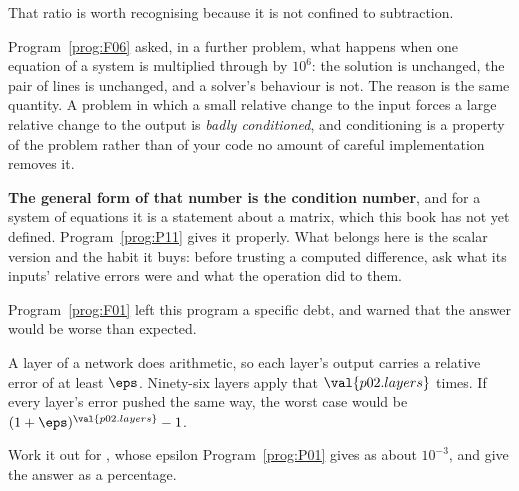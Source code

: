 \begin{fr}

That ratio is worth recognising because it is not confined to subtraction.

Program~\ref{prog:F06} asked, in a further problem, what happens when one
equation of a system is multiplied through by $10^{6}$: the solution is
unchanged, the pair of lines is unchanged, and a solver's behaviour is not.
The reason is the same quantity. A problem in which a small relative change to
the input forces a large relative change to the output is \emph{badly
conditioned}, and conditioning is a property of the problem rather than of your
code \dash{} no amount of careful implementation removes it.

\begin{rigourbox}
\textbf{The general form of that number is the condition number}, and for a
system of equations it is a statement about a matrix, which this book has not
yet defined. Program~\ref{prog:P11} gives it properly. What belongs here is the
scalar version and the habit it buys: before trusting a computed difference,
ask what its inputs' relative errors were and what the operation did to them.
\end{rigourbox}
\end{fr}

\begin{fr}
Program~\ref{prog:F01} left this program a specific debt, and warned that the
answer would be worse than expected.

A layer of a network does arithmetic, so each layer's output carries a
relative error of at least $\eps$. Ninety-six layers apply that
$\val{p02.layers}$ times. If every layer's error pushed the same way, the
worst case would be $(1 + \eps)^{\val{p02.layers}} - 1$.

Work it out for , whose epsilon Program~\ref{prog:P01} gives as
about $10^{-3}$, and give the answer as a percentage.
\nextframe
\end{fr}


